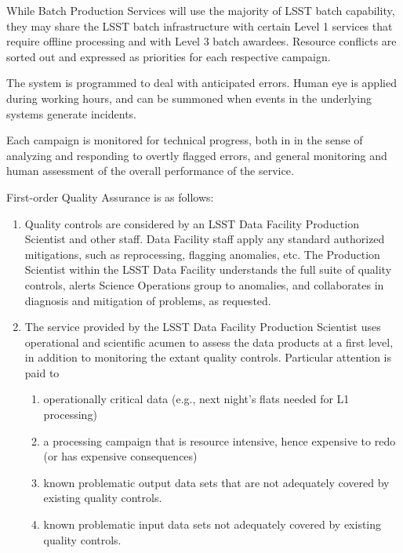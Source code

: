 While Batch Production Services will use the majority of LSST batch capability,
they may share the LSST batch infrastructure with certain Level 1 services that
require offline processing and with Level 3 batch awardees. Resource conflicts
are sorted out and expressed as priorities for each respective campaign.

The system is programmed to deal with anticipated errors. Human eye is applied
during working hours, and can be summoned when events in the underlying systems
 generate incidents.

Each campaign is monitored for technical progress, both in in the sense of
analyzing and responding to overtly flagged errors, and general monitoring and
human assessment of the overall performance of the service.

First-order Quality Assurance is as follows:

\begin{enumerate}

\item Quality controls are considered by an LSST Data Facility Production
Scientist and other staff. Data Facility staff apply any standard authorized
mitigations, such as reprocessing, flagging anomalies, etc. The Production
Scientist within the LSST Data Facility understands the full suite of quality
controls, alerts Science Operations group to anomalies, and collaborates in
diagnosis and mitigation of problems, as requested.

\item The service provided by the LSST Data Facility Production Scientist uses
operational and scientific acumen to assess the data products at a first level,
in addition to monitoring the extant quality controls. Particular attention is
paid to

    \begin{enumerate}

    \item operationally critical data (e.g., next night’s flats needed for L1
    processing)

    \item a processing campaign that is resource intensive, hence expensive to
    redo (or has expensive consequences)

    \item known problematic output data sets that are not adequately covered by
    existing quality controls.

    \item known problematic input data sets not adequately covered by existing
    quality controls.

    \end{enumerate}

\end{enumerate}

